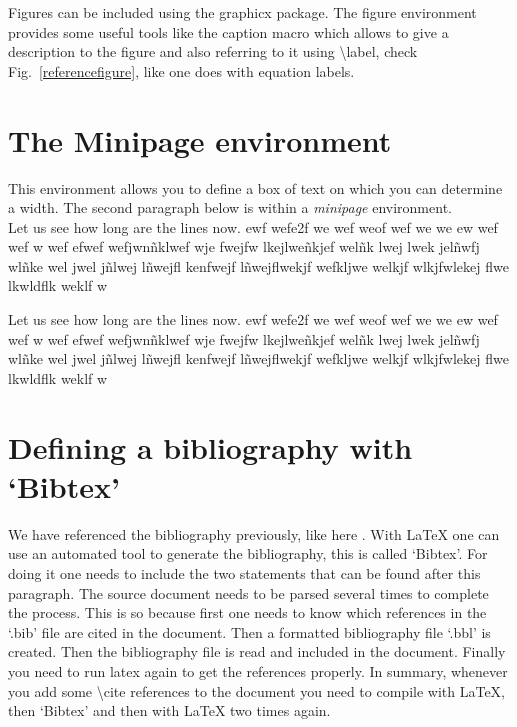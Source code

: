 \documentclass[a4paper]{article}
\newcommand{\bs}[1]{{\color{blue}\textbackslash{}#1}}
\begin{document}
Figures can be included using the {\ttfamily graphicx} package. The {\ttfamily figure} environment provides some useful tools like the {\ttfamily caption} macro which allows to give a description to the figure and also referring to it using \bs{label}, check Fig.~\ref{referencefigure}, like one does with equation labels.

\section{The Minipage environment}

This environment allows you to define a box of text on which you can determine a width. The second paragraph below is within a \emph{minipage} environment.\\

Let us see how long are the lines now. ewf wefe2f we wef weof wef we we ew wef wef w wef efwef wefjwnñklwef wje fwejfw lkejlweñkjef welñk lwej lwek jelñwfj wlñke wel jwel jñlwej lñwejfl kenfwejf lñwejflwekjf wefkljwe welkjf wlkjfwlekej flwe lkwldflk weklf w\\ 

\begin{minipage}[b]{.5\textwidth}
Let us see how long are the lines now. ewf wefe2f we wef weof wef we we ew wef wef w wef efwef wefjwnñklwef wje fwejfw lkejlweñkjef welñk lwej lwek jelñwfj wlñke wel jwel jñlwej lñwejfl kenfwejf lñwejflwekjf wefkljwe welkjf wlkjfwlekej flwe lkwldflk weklf w 
\end{minipage}


\section{Defining a bibliography with `Bibtex'}

We have referenced the bibliography previously, like here \cite{Stone1932}. With \LaTeX{} one can use an automated tool to generate the bibliography, this is called `Bibtex'.  For doing it one needs to include the two statements that can be found after this paragraph. The source document needs to be parsed several times to complete the process. This is so because first one needs to know which references in the `.bib' file are cited in the document. Then a formatted bibliography file `.bbl' is created. Then the bibliography file is read and included in the document. Finally you need to run latex again to get the references properly. In summary, whenever you add some \bs{cite} references to the document you need to compile with \LaTeX{}, then `Bibtex' and then with \LaTeX{} two times again. 




\end{document}
